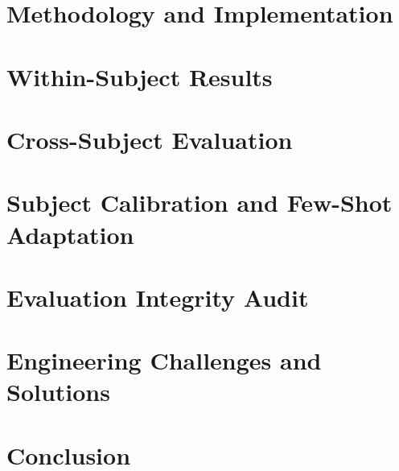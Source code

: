 \documentclass[Times,12pt,oneside,openany,print,index]{report}
\begin{document}
\chapter{Methodology and Implementation}
\label{chap:methodology}
\label{chap:implementation}


\chapter{Within-Subject Results}
\label{chap:within}


\chapter{Cross-Subject Evaluation}
\label{chap:crosssubject}


\chapter{Subject Calibration and Few-Shot Adaptation}
\label{chap:calibration}


\chapter{Evaluation Integrity Audit}
\label{chap:audit}


\chapter{Engineering Challenges and Solutions}
\label{chap:engineering_challenges}


\chapter{Conclusion}
\label{chap:conclusion}




\printbibliography %
\end{document}
